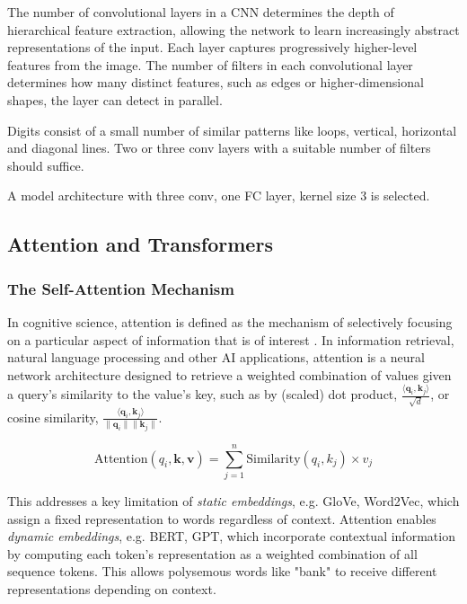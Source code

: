 The number of convolutional layers in a CNN determines the depth of hierarchical feature extraction, allowing the network to learn increasingly abstract representations of the input.
Each layer captures progressively higher-level features from the image.
The number of filters in each convolutional layer determines how many distinct features, such as edges or higher-dimensional shapes, the layer can detect in parallel.

Digits consist of a small number of similar patterns like loops, vertical, horizontal and diagonal lines.
Two or three conv layers with a suitable number of filters should suffice.

A model architecture with three conv, one FC layer, kernel size 3 is selected.

\subsection{Attention and Transformers}

\subsubsection{The Self-Attention Mechanism}

In cognitive science, attention is defined as the mechanism of selectively focusing on a particular aspect of information that is of interest \citep{gilhooly2014cognitive}.
In information retrieval, natural language processing and other AI applications,
attention is a neural network architecture designed to
retrieve a weighted combination of values given a query's similarity to the value's key,
such as by (scaled) dot product, $\frac{\langle \textbf{q}_i, \textbf{k}_j \rangle}{\sqrt{d}}$,
or cosine similarity, $\frac{\langle \textbf{q}_i, \textbf{k}_j \rangle}{\lVert \textbf{q}_i \rVert \lVert \textbf{k}_j \rVert}$. \citep{prince2023understanding,ye2022geometry}

\vspace{-5pt}
\begin{equation}
    \text{Attention}(q_i, \textbf{k}, \textbf{v}) = \sum_{j=1}^n{ \text{Similarity}(q_i, k_j) \times v_j }
\end{equation}
\vspace{-5pt}

This addresses a key limitation of \textit{static embeddings}, e.g. GloVe, Word2Vec,
which assign a fixed representation to words regardless of context.
Attention enables \textit{dynamic embeddings}, e.g. BERT, GPT, which incorporate contextual information
by computing each token's representation as a weighted combination of all sequence tokens.
This allows polysemous words like "bank" to receive different representations depending on context.


